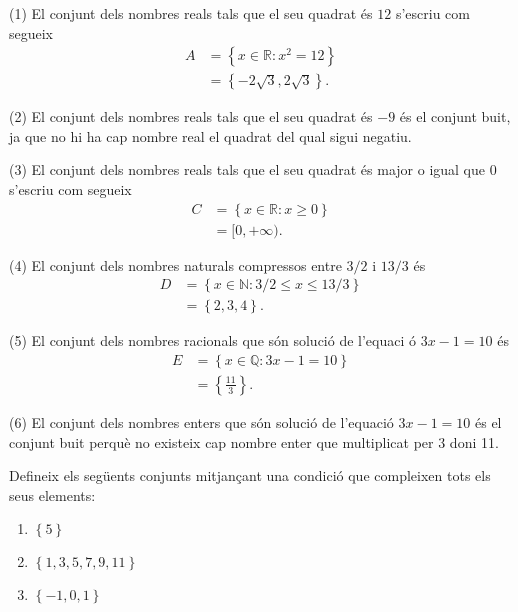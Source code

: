 \begin{solucio}
(1) El conjunt dels nombres reals tals que el seu quadrat \'{e}s $12$
s'escriu com segueix%
\begin{align*}
A& =\left\{ x\in \mathbb{R}:x^{2}=12\right\} \\
& =\left\{ -2\sqrt{3},2\sqrt{3}\right\} \text{.}
\end{align*}

(2) El conjunt dels nombres reals tals que el seu quadrat \'{e}s $-9$ \'{e}s
el conjunt buit, ja que no hi ha cap nombre real el quadrat del qual sigui
negatiu.

(3) El conjunt dels nombres reals tals que el seu quadrat \'{e}s major o
igual que $0$ s'escriu com segueix%
\begin{align*}
C& =\left\{ x\in \mathbb{R}:x\geq 0\right\} \\
& =[0,+\infty )\text{.}
\end{align*}

(4) El conjunt dels nombres naturals compressos entre $3/2$ i $13/3$ \'{e}s%
\begin{align*}
D& =\left\{ x\in \mathbb{N}:3/2\leq x\leq 13/3\right\} \\
& =\left\{ 2,3,4\right\} \text{.}
\end{align*}

(5) El conjunt dels nombres racionals que s\'{o}n soluci\'{o} de l'equaci%
\'{o} $3x-1=10$ \'{e}s%
\begin{align*}
E& =\left\{ x\in \mathbb{Q}:3x-1=10\right\} \\
& =\left\{ \frac{11}{3}\right\} \text{.}
\end{align*}

(6) El conjunt dels nombres enters que s\'{o}n soluci\'{o} de l'equaci\'{o} $%
3x-1=10$ \'{e}s el conjunt buit perqu\`{e} no existeix cap nombre enter que
multiplicat per $3$ doni 11.
\end{solucio}

\begin{exercici}
Defineix els seg\"{u}ents conjunts mitjan\c{c}ant una condici\'{o} que
compleixen tots els seus elements:

\begin{enumerate}
\item $\left\{ 5\right\} $

\item $\left\{ 1,3,5,7,9,11\right\} $

\item $\left\{ -1,0,1\right\} $
\end{enumerate}
\end{exercici}

